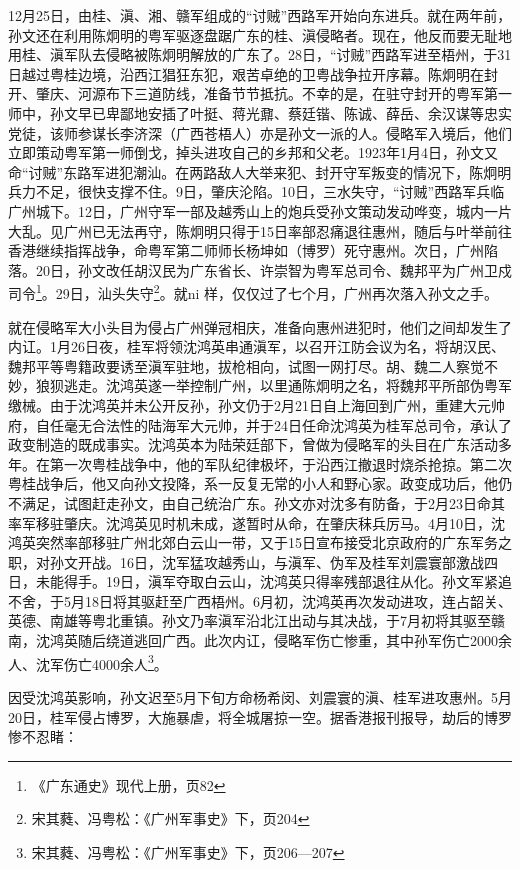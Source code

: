 12月25日，由桂、滇、湘、赣军组成的“讨贼”西路军开始向东进兵。就在两年前，孙文还在利用陈炯明的粤军驱逐盘踞广东的桂、滇侵略者。现在，他反而要无耻地用桂、滇军队去侵略被陈炯明解放的广东了。28日，“讨贼”西路军进至梧州，于31日越过粤桂边境，沿西江猖狂东犯，艰苦卓绝的卫粤战争拉开序幕。陈炯明在封开、肇庆、河源布下三道防线，准备节节抵抗。不幸的是，在驻守封开的粤军第一师中，孙文早已卑鄙地安插了叶挺、蒋光鼐、蔡廷锴、陈诚、薛岳、余汉谋等忠实党徒，该师参谋长李济深（广西苍梧人）亦是孙文一派的人。侵略军入境后，他们立即策动粤军第一师倒戈，掉头进攻自己的乡邦和父老。1923年1月4日，孙文又命“讨贼”东路军进犯潮汕。在两路敌人大举来犯、封开守军叛变的情况下，陈炯明兵力不足，很快支撑不住。9日，肇庆沦陷。10日，三水失守，“讨贼”西路军兵临广州城下。12日，广州守军一部及越秀山上的炮兵受孙文策动发动哗变，城内一片大乱。见广州已无法再守，陈炯明只得于15日率部忍痛退往惠州，随后与叶举前往香港继续指挥战争，命粤军第二师师长杨坤如（博罗）死守惠州。次日，广州陷落。20日，孙文改任胡汉民为广东省长、许崇智为粤军总司令、魏邦平为广州卫戍司令\footnote{《广东通史》现代上册，页82}。29日，汕头失守\footnote{宋其蕤、冯粤松：《广州军事史》下，页204}。就ni 样，仅仅过了七个月，广州再次落入孙文之手。

就在侵略军大小头目为侵占广州弹冠相庆，准备向惠州进犯时，他们之间却发生了内讧。1月26日夜，桂军将领沈鸿英串通滇军，以召开江防会议为名，将胡汉民、魏邦平等粤籍政要诱至滇军驻地，拔枪相向，试图一网打尽。胡、魏二人察觉不妙，狼狈逃走。沈鸿英遂一举控制广州，以里通陈炯明之名，将魏邦平所部伪粤军缴械。由于沈鸿英并未公开反孙，孙文仍于2月21日自上海回到广州，重建大元帅府，自任毫无合法性的陆海军大元帅，并于24日任命沈鸿英为桂军总司令，承认了政变制造的既成事实。沈鸿英本为陆荣廷部下，曾做为侵略军的头目在广东活动多年。在第一次粤桂战争中，他的军队纪律极坏，于沿西江撤退时烧杀抢掠。第二次粤桂战争后，他又向孙文投降，系一反复无常的小人和野心家。政变成功后，他仍不满足，试图赶走孙文，由自己统治广东。孙文亦对沈多有防备，于2月23日命其率军移驻肇庆。沈鸿英见时机未成，遂暂时从命，在肇庆秣兵厉马。4月10日，沈鸿英突然率部移驻广州北郊白云山一带，又于15日宣布接受北京政府的广东军务之职，对孙文开战。16日，沈军猛攻越秀山，与滇军、伪军及桂军刘震寰部激战四日，未能得手。19日，滇军夺取白云山，沈鸿英只得率残部退往从化。孙文军紧追不舍，于5月18日将其驱赶至广西梧州。6月初，沈鸿英再次发动进攻，连占韶关、英德、南雄等粤北重镇。孙文乃率滇军沿北江出动与其决战，于7月初将其驱至赣南，沈鸿英随后绕道逃回广西。此次内讧，侵略军伤亡惨重，其中孙军伤亡2000余人、沈军伤亡4000余人\footnote{宋其蕤、冯粤松：《广州军事史》下，页206—207}。

因受沈鸿英影响，孙文迟至5月下旬方命杨希闵、刘震寰的滇、桂军进攻惠州。5月20日，桂军侵占博罗，大施暴虐，将全城屠掠一空。据香港报刊报导，劫后的博罗惨不忍睹：


